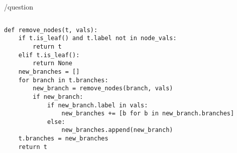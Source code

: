 /question

\begin{lstlisting}
\end{lstlisting}

\begin{solution}
\begin{lstlisting}
def remove_nodes(t, vals):
    if t.is_leaf() and t.label not in node_vals:
        return t
    elif t.is_leaf():
        return None
    new_branches = []
    for branch in t.branches:
        new_branch = remove_nodes(branch, vals)
        if new_branch:
            if new_branch.label in vals:
                new_branches += [b for b in new_branch.branches]
            else:
                new_branches.append(new_branch)
    t.branches = new_branches
    return t
\end{lstlisting}
\end{solution}